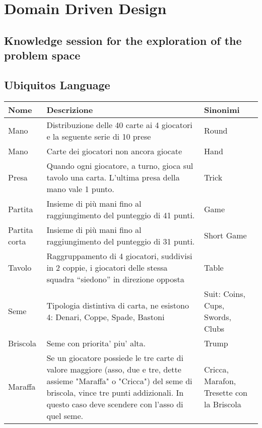 \chapter{Domain Driven Design}
\label{ch:ddd} %

\section{Knowledge session for the exploration of the problem space}
\section{Ubiquitos Language}
\begin{table}[!ht]
    \centering
    \begin{adjustbox}{max width=1.1\textwidth,center}
    \begin{tabular}{|l|l|l|}
    \hline
        Nome & Descrizione & Sinonimi \\ \hline
        Mano & Distribuzione delle 40 carte ai 4 giocatori e la seguente serie di 10 prese & Round \\ \hline
        Mano & Carte dei giocatori non ancora giocate & Hand \\ \hline
        Presa & Quando ogni giocatore, a turno, gioca sul tavolo una carta. L’ultima presa della mano vale 1 punto. & Trick \\ \hline
        Partita & Insieme di più mani fino al raggiungimento del punteggio di 41 punti. & Game \\ \hline
        Partita corta & Insieme di più mani fino al raggiungimento del punteggio di 31 punti. & Short Game \\ \hline
        Tavolo & Raggruppamento di 4 giocatori, suddivisi in 2 coppie, i giocatori delle stessa squadra “siedono” in direzione opposta & Table \\ \hline
        Seme & Tipologia distintiva di carta, ne esistono 4: Denari, Coppe, Spade, Bastoni & Suit: Coins, Cups, Swords, Clubs~ \\ \hline
        Briscola & Seme con priorita’ piu’ alta. & Trump \\ \hline
        Maraffa & Se un giocatore possiede le tre carte di valore maggiore (asso, due e tre, dette assieme "Maraffa" o "Cricca") del seme di briscola, vince tre punti addizionali. In questo caso deve scendere con l'asso di quel seme. & Cricca, Marafon, Tresette con la Briscola \\ \hline

\end{tabular}
\end{adjustbox}
\end{table}
